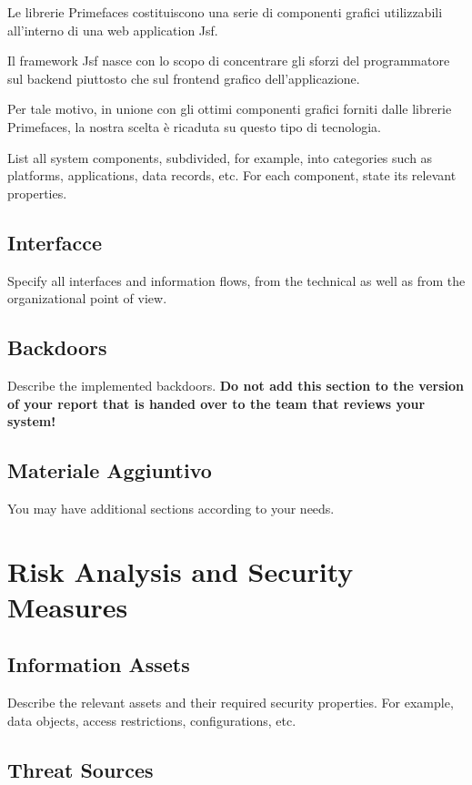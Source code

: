 \documentclass{article}
\begin{document}
Le librerie Primefaces costituiscono una serie di componenti grafici utilizzabili all'interno di una web application Jsf.


Il framework Jsf nasce con lo scopo di concentrare gli sforzi del programmatore sul backend piuttosto che sul frontend grafico dell'applicazione.

Per tale motivo, in unione con gli ottimi componenti grafici forniti dalle librerie Primefaces, la nostra scelta è ricaduta su questo tipo di tecnologia.

List all system components, subdivided, for example, into
  categories such as platforms, applications, data records, etc. For
  each component, state its relevant properties.


\subsection{Interfacce}

Specify  all interfaces and  information flows, from the technical as well as from the
  organizational point of view.

\subsection{Backdoors}

Describe the implemented backdoors. {\bfseries Do not add
    this section to the version of your report that is handed over to
    the team that reviews your system!}

\subsection{Materiale Aggiuntivo}

You may have additional sections according to your needs.


\section{Risk Analysis and Security Measures}

\subsection{Information Assets}

Describe the relevant assets and their required security
  properties. For example, data objects, access restrictions,
  configurations, etc.

\subsection{Threat Sources}
\end{document}
